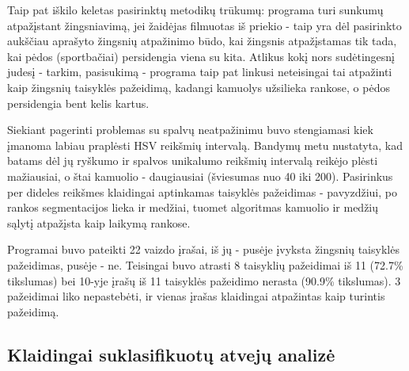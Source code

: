 \documentclass{VUMIFPSkursinis}
\begin{document}
Taip pat iškilo keletas pasirinktų metodikų trūkumų: programa turi sunkumų atpažįstant žingsniavimą, jei žaidėjas filmuotas iš priekio - taip yra dėl pasirinkto aukščiau aprašyto žingsnių atpažinimo būdo, kai žingsnis atpažįstamas tik tada, kai pėdos (sportbačiai) persidengia viena su kita. Atlikus kokį nors sudėtingesnį judesį - tarkim, pasisukimą - programa taip pat linkusi neteisingai tai atpažinti kaip žingsnių taisyklės pažeidimą, kadangi kamuolys užsilieka rankose, o pėdos persidengia bent kelis kartus. 


Siekiant pagerinti problemas su spalvų neatpažinimu buvo stengiamasi kiek įmanoma labiau praplėsti HSV reikšmių intervalą. Bandymų metu nustatyta, kad batams dėl jų ryškumo ir spalvos unikalumo reikšmių intervalą reikėjo plėsti mažiausiai, o štai kamuolio - daugiausiai (šviesumas nuo 40 iki 200). Pasirinkus per dideles reikšmes klaidingai aptinkamas taisyklės pažeidimas - pavyzdžiui, po rankos segmentacijos lieka ir medžiai, tuomet algoritmas kamuolio ir medžių sąlytį atpažįsta kaip laikymą rankose.


Programai buvo pateikti 22 vaizdo įrašai, iš jų - pusėje įvyksta žingsnių taisyklės pažeidimas, pusėje - ne. Teisingai buvo atrasti 8 taisyklių pažeidimai iš 11 (72.7\% tikslumas) bei 10-yje įrašų iš 11 taisyklės pažeidimo nerasta (90.9\% tikslumas). 3 pažeidimai liko nepastebėti, ir vienas įrašas klaidingai atpažintas kaip turintis pažeidimą. 


\subsection{Klaidingai suklasifikuotų atvejų analizė}
\end{document}
